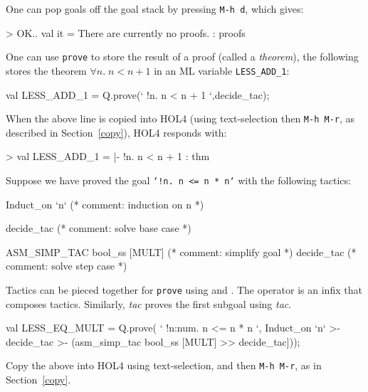 \documentclass[a4paper,10pt]{article}
\begin{document}

One can pop goals off the goal stack by pressing {\tt M-h d}, which gives:
\begin{code}
> OK..
val it = There are currently no proofs. : proofs
\end{code}


One can use {\tt prove} to store the result of a proof (called a
\emph{theorem}), \eg{} the following stores the theorem $\forall n.\;n < n +
1$ in an ML variable {\tt LESS\_ADD\_1}:
\begin{code}
val LESS_ADD_1 = Q.prove({`} !n. n < n + 1 {`},decide_tac);
\end{code}
When the above line is copied into HOL4 (using text-selection then
{\tt M-h M-r}, as described in Section~\ref{copy}), HOL4 responds with:
\begin{code}
> val LESS_ADD_1 = |- !n. n < n + 1 : thm
\end{code}


Suppose we have proved the goal {\tt `!n{.}~n <= n * n`} with the following tactics:
\begin{code}
Induct_on `n`                   (* comment: induction on n  *)

  decide_tac                    (* comment: solve base case *)

  ASM_SIMP_TAC bool_ss [MULT]   (* comment: simplify goal   *)
  decide_tac                    (* comment: solve step case *)
\end{code}
Tactics can be pieced together for {\tt prove} using \ml{\gt\gt} and \ml{\gt-}. The \ml{\gt\gt} operator is an infix that composes tactics. Similarly, \ml{\gt-} \emph{tac} proves the first subgoal using \emph{tac}.
\begin{code}
val LESS_EQ_MULT = Q.prove(
  {`} !n:num. n <= n * n {`},
  Induct_on `n`
  >- decide_tac
  >- (asm_simp_tac bool_ss [MULT]
      >> decide_tac]));
\end{code}
Copy the above into HOL4 using text-selection, and then {\tt M-h M-r}, as in Section~\ref{copy}.

\newcommand{\itemz}[2]{\texttt{#1}\; &-\;\; \textrm{#2}}
\newcommand{\itemy}[2]{#1&\quad\quad&#2\\}
\end{document}
